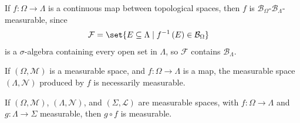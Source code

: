 \begin{example}
  If $f: \Omega\rightarrow \Lambda$ is a continuous map between topological spaces, then $f$ is $\mathcal{B}_{\Omega}$-$\mathcal{B}_{\Lambda}$-measurable, since
  \begin{align*}
    \mathcal{F} &= \set{E\subseteq \Lambda\mid f^{-1}\left(E\right)\in \mathcal{B}_{\Omega}}
  \end{align*}
  is a $\sigma$-algebra containing every open set in $\Lambda$, so $\mathcal{F}$ contains $\mathcal{B}_{\Lambda}$.
\end{example}

\begin{example}
  If $\left(\Omega,\mathcal{M}\right)$ is a measurable space, and $f: \Omega\rightarrow \Lambda$ is a map, the measurable space $\left(\Lambda,\mathcal{N}\right)$ produced by $f$ is necessarily measurable.
\end{example}

\begin{fact}\label{fact:composition}
  If $\left(\Omega,\mathcal{M}\right)$, $\left(\Lambda,\mathcal{N}\right)$, and $\left(\Sigma,\mathcal{L}\right)$ are measurable spaces, with $f: \Omega\rightarrow \Lambda$ and $g: \Lambda\rightarrow \Sigma$ measurable, then $g\circ f$ is measurable.
\end{fact}

